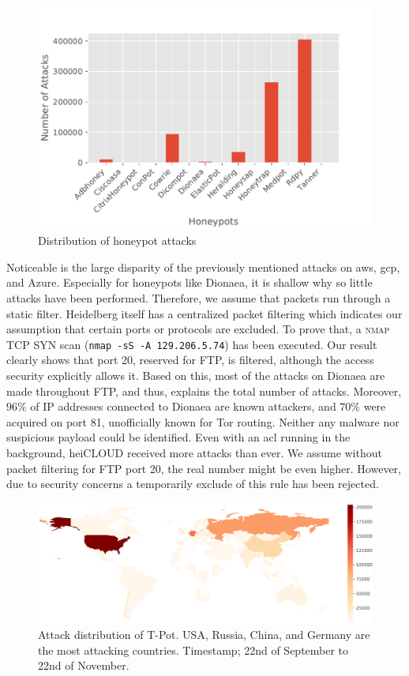 \begin{figure}[ht]
    \centering
    \includegraphics[width=\textwidth]{figures/tpot-overview-attacks.pdf}
    \caption[Distribution of honeypot attacks]{Distribution of honeypot attacks}
    \label{fig:overview-attacks}
\end{figure}

Noticeable is the large disparity of the previously mentioned attacks on \ac{aws}, \ac{gcp}, and Azure.
Especially for honeypots like Dionaea, it is shallow why so little attacks have been performed.
Therefore, we assume that packets run through a static filter. 
Heidelberg itself has a centralized packet filtering which indicates our assumption that certain ports or protocols are excluded.
To prove that, a \textsc{nmap} TCP SYN scan (\verb|nmap -sS -A 129.206.5.74|) has been executed.
Our result clearly shows that port 20, reserved for FTP, is filtered, although the access security explicitly allows it.
Based on this, most of the attacks on Dionaea are made throughout FTP, and thus, explains the total number of attacks.
Moreover, $96\%$ of IP addresses connected to Dionaea are known attackers, and $70\%$ were acquired on port 81, unofficially known for Tor routing.
Neither any malware nor suspicious payload could be identified.
Even with an \ac{acl} running in the background, heiCLOUD received more attacks than ever.
We assume without packet filtering for FTP port 20, the real number might be even higher.
However, due to security concerns a temporarily exclude of this rule has been rejected.

\begin{figure}[ht]
    \centering
    \includegraphics[width=\textwidth]{figures/tpot-overview-map.pdf}
    \caption[Attack distribution of T-Pot]{Attack distribution of T-Pot. USA, Russia, China, and Germany are the most attacking countries. Timestamp; 22nd of September to 22nd of November.}
    \label{fig:attack-distribution}
\end{figure}

